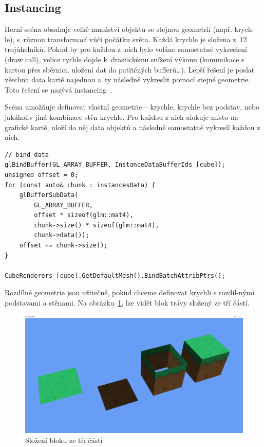 \documentclass[thesis=M,czech]{FITthesis}[2019/12/23]
\begin{document}
\subsection{Instancing}

Herní scéna obsahuje velké množství objektů se stejnou geometrií (např. krych-le), s~různou transformací vůči počátku světa. Každá krychle je složena z~12 trojúhelníků. Pokud by pro každou z~nich bylo voláno samostatné vykreslení (draw call), velice rychle dojde k~drastickému snížení výkonu (komunikace s kartou přes sběrnici, uložení dat do patřičných bufferů\dots). Lepší řešení je poslat všechna data kartě najednou a~ty následně vykreslit pomocí stejné geometrie. Toto řešení se nazývá instancing~\cite{lopgl_instancing}.

Scéna umožňuje definovat vlastní geometrie -- krychle, krychle bez podstav, nebo jakákoliv jiná kombinace stěn krychle. Pro každou z nich alokuje místo na grafické kartě, uloží do něj data objektů a následně samostatně vykreslí každou z nich.

\begin{verbatim}
// bind data
glBindBuffer(GL_ARRAY_BUFFER, InstanceDataBufferIds_[cube]);
unsigned offset = 0;
for (const auto& chunk : instancesData) {
    glBufferSubData(
        GL_ARRAY_BUFFER,
        offset * sizeof(glm::mat4), 
        chunk->size() * sizeof(glm::mat4), 
        chunk->data());
    offset += chunk->size();
}

CubeRenderers_[cube].GetDefaultMesh().BindBatchAttribPtrs();
\end{verbatim}

Rozdílné geometrie jsou užitečné, pokud chceme definovat krychli s rozdíl-nými podstavami a stěnami. Na obrázku~\ref{fig:block_composition}, lze vidět blok trávy složený ze tří částí.

\begin{figure}\centering
	\includegraphics[width=\textwidth]{images/block_composition}
	\caption[Složení bloku ze tří částí]{Složení bloku ze tří částí}\label{fig:block_composition}
\end{figure}
\end{document}
